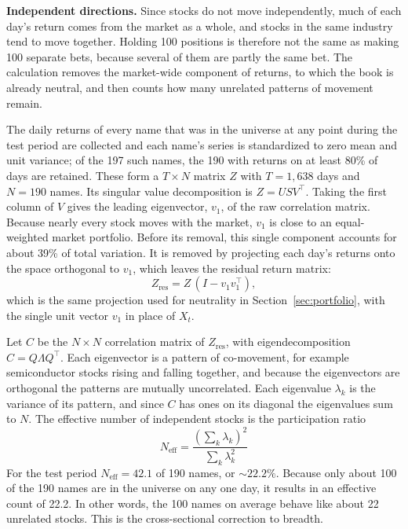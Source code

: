 \documentclass[11pt]{article}
\begin{document}
\textbf{Independent directions.} Since stocks do not move independently, much of each day's return comes from the market as a whole, and stocks in the same industry tend to move together. Holding 100 positions is therefore not the same as making 100 separate bets, because several of them are partly the same bet. The calculation removes the market-wide component of returns, to which the book is already neutral, and then counts how many unrelated patterns of movement remain.

The daily returns of every name that was in the universe at any point during the test period are collected and each name's series is standardized to zero mean and unit variance; of the 197 such names, the 190 with returns on at least 80\% of days are retained. These form a $T\times N$ matrix $Z$ with $T=1{,}638$ days and $N=190$ names. Its singular value decomposition is $Z=USV^\top$. Taking the first column of $V$ gives the leading eigenvector, $v_1$, of the raw correlation matrix. Because nearly every stock moves with the market, $v_1$ is close to an equal-weighted market portfolio. Before its removal, this single component accounts for about 39\% of total variation. It is removed by projecting each day's returns onto the space orthogonal to $v_1$, which leaves the residual return matrix:
\begin{equation}
 Z_{\mathrm{res}} = Z\,(I - v_1 v_1^\top),
\end{equation}
which is the same projection used for neutrality in Section~\ref{sec:portfolio}, with the single unit vector $v_1$ in place of $X_t$.

Let $C$ be the $N\times N$ correlation matrix of $Z_{\mathrm{res}}$, with eigendecomposition $C=Q\Lambda Q^\top$. Each eigenvector is a pattern of co-movement, for example semiconductor stocks rising and falling together, and because the eigenvectors are orthogonal the patterns are mutually uncorrelated. Each eigenvalue $\lambda_k$ is the variance of its pattern, and since $C$ has ones on its diagonal the eigenvalues sum to $N$. The effective number of independent stocks is the participation ratio
\begin{equation}
 N_{\mathrm{eff}}=\frac{\left(\sum_k\lambda_k\right)^2}{\sum_k\lambda_k^2}
\end{equation}
For the test period $N_{\mathrm{eff}}=42.1$ of 190 names, or \(\sim 22.2\%\). Because only about 100 of the 190 names are in the universe on any one day, it results in an effective count of 22.2. In other words, the 100 names on average behave like about 22 unrelated stocks. This is the cross-sectional correction to breadth.\par
\end{document}
